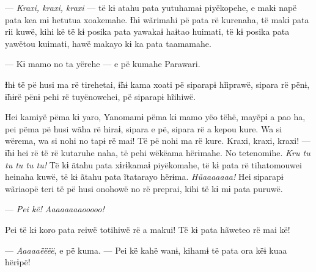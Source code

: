
--- \textit{Kraxi, kraxi, kraxi} --- të kɨ atahu pata yutuhamaɨ piyëkopehe, e
makɨ napë pata kea mɨ hetutua xoakemahe. Ɨhɨ wãrimahi pë pata rë
kurenaha, të makɨ pata rii kuwë, kihi kë të kɨ posika pata yawakaɨ
haɨtao huimati, të kɨ posika pata yawëtou kuimati, hawë makayo kɨ ka
pata taamamahe. 

--- Kɨ mamo no ta yërehe --- e pë kumahe Parawari. 

Ɨhɨ të pë husi ma rë tirehetai, ɨ̃hɨ kama xoati pë siparapɨ hĩiprawë,
sipara rë pënɨ, ɨ̃hɨrë pënɨ pehi rë tuyënowehei, pë siparapɨ hĩihiwë. 

Hei kamiyë pëma kɨ yaro, Yanomamɨ pëma kɨ mamo yëo tëhë, mayẽpɨ a pao
ha, pei pëma pë husi wãha rë hiraɨ, sipara e pë, sipara rë a kepou kure.
Wa si wërema, wa si nohi no tapɨ rë mai! Të pë nohi ma rë kure. Kraxi,
kraxi, kraxi! --- ɨ̃hɨ hei rë të rë kutaruhe naha, të pehi wëkëama
hërɨmahe. No tetenomihe. \textit{Kru tu tu tu tu tu!} Të kɨ ãtahu pata xɨrɨkamaɨ
piyëkomahe, të kɨ pata rë tihatomouwei heinaha kuwë, të kɨ ãtahu pata
ĩtatarayo hërɨma. \textit{Hũaaaaaaa!} Hei siparapɨ wãriaopë teri të pë husi
onohowë no rë preprai, kihi të kɨ mɨ pata puruwë. 


--- \textit{Pei kë!} \textit{Aaaaaaaaooooo!} 

Pei të kɨ koro pata reiwë totihiwë rë a makui! Të kɨ pata hãweteo rë mai
kë! 

--- \textit{Aaaaaëëëë}, e pë kuma. --- Pei kë kahë wanɨ, kihamɨ të pata ora këɨ
kuaa hërɨpë! 


